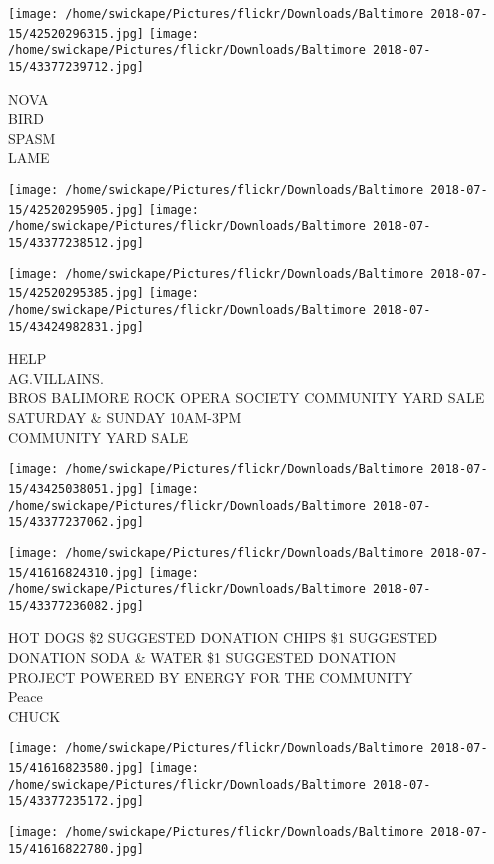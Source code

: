 \documentclass[10pt,letterpaper]{article}
\begin{document}
\texttt{[image: /home/swickape/Pictures/flickr/Downloads/Baltimore 2018-07-15/42520296315.jpg]}
\texttt{[image: /home/swickape/Pictures/flickr/Downloads/Baltimore 2018-07-15/43377239712.jpg]}

NOVA\\
BIRD\\
SPASM\\
LAME
\pagebreak

\texttt{[image: /home/swickape/Pictures/flickr/Downloads/Baltimore 2018-07-15/42520295905.jpg]}
\texttt{[image: /home/swickape/Pictures/flickr/Downloads/Baltimore 2018-07-15/43377238512.jpg]}

\texttt{[image: /home/swickape/Pictures/flickr/Downloads/Baltimore 2018-07-15/42520295385.jpg]}
\texttt{[image: /home/swickape/Pictures/flickr/Downloads/Baltimore 2018-07-15/43424982831.jpg]}

HELP\\
AG.VILLAINS.\\
BROS BALIMORE ROCK OPERA SOCIETY COMMUNITY YARD SALE SATURDAY \& SUNDAY 10AM{-}3PM\\
COMMUNITY YARD SALE
\pagebreak

\texttt{[image: /home/swickape/Pictures/flickr/Downloads/Baltimore 2018-07-15/43425038051.jpg]}
\texttt{[image: /home/swickape/Pictures/flickr/Downloads/Baltimore 2018-07-15/43377237062.jpg]}

\texttt{[image: /home/swickape/Pictures/flickr/Downloads/Baltimore 2018-07-15/41616824310.jpg]}
\texttt{[image: /home/swickape/Pictures/flickr/Downloads/Baltimore 2018-07-15/43377236082.jpg]}

HOT DOGS \$2 SUGGESTED DONATION CHIPS \$1 SUGGESTED DONATION SODA \& WATER \$1 SUGGESTED DONATION\\
PROJECT POWERED BY ENERGY FOR THE COMMUNITY\\
Peace\\
CHUCK
\pagebreak

\texttt{[image: /home/swickape/Pictures/flickr/Downloads/Baltimore 2018-07-15/41616823580.jpg]}
\texttt{[image: /home/swickape/Pictures/flickr/Downloads/Baltimore 2018-07-15/43377235172.jpg]}

\vspace{0.25in}
\texttt{[image: /home/swickape/Pictures/flickr/Downloads/Baltimore 2018-07-15/41616822780.jpg]}
\end{document}
